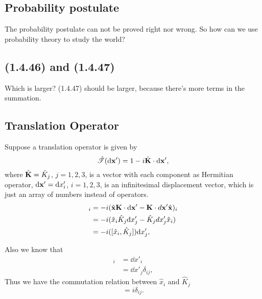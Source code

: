 \documentclass[10pt]{article}
\begin{document}
	\subsection{Probability postulate}

	The probability postulate can not be proved right nor wrong. So how can we use probability theory to study the world?

	\subsection{(1.4.46) and (1.4.47)}

	Which is larger? (1.4.47) should be larger, because there's more terms in the summation.

	\subsection{Translation Operator}

	Suppose a translation operator is given by
	\begin{equation}
		\hat{\mathscr{T}}(\dd \bfx') = 1-i\hat{\bfK}\cdot \dd\bfx',
	\end{equation}
	where $\hat{{\bf K}} = \hat{K}_j$, $j = 1,2,3$, is a vector with each component as Hermitian operator, $\dd \bfx' = \dd x'_i$, $i = 1,2,3$, is an infinitesimal displacement vector, which is just an array of numbers instead of operators.
	\begin{align*}
		[\hat{\bfx}, \hat{\mathscr{T}}(d\bfx')]_i &= -i (\hat{\bfx} \bfK\cdot \dd\bfx' - \bfK\cdot d\bfx'\hat{\bfx})_i \\
		&= -i(\hat{x}_i \hat{K}_j \dd x'_j - \hat{K}_j dx'_j \hat{x}_i) \\
		&= -i([\hat{x}_i, \hat{K}_j]) \dd x'_j,
	\end{align*}

	Also we know that
	\begin{align*}
		[\hat{\bfx}, \hat{\mathscr{T}}(d\bfx')]_i &= \dd x'_i \\
		&= \dd x'_j \delta_{ij},
	\end{align*}
	Thus we have the commutation relation between $\hat{x}_i$ and $\hat{K}_j$
	\begin{equation}
		[\hat{x}_i, \hat{K}_j] = i \delta_{ij}.
	\end{equation}
\end{document}

